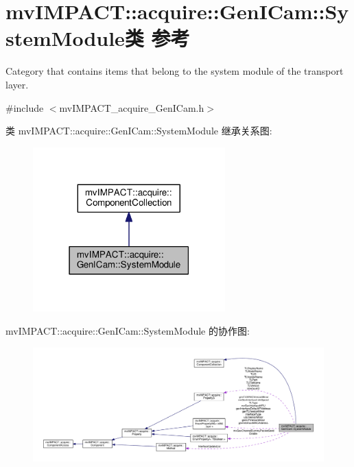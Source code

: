 \hypertarget{classmv_i_m_p_a_c_t_1_1acquire_1_1_gen_i_cam_1_1_system_module}{\section{mv\+I\+M\+P\+A\+C\+T\+:\+:acquire\+:\+:Gen\+I\+Cam\+:\+:System\+Module类 参考}
\label{classmv_i_m_p_a_c_t_1_1acquire_1_1_gen_i_cam_1_1_system_module}
}


Category that contains items that belong to the system module of the transport layer.  




{\ttfamily \#include $<$mv\+I\+M\+P\+A\+C\+T\+\_\+acquire\+\_\+\+Gen\+I\+Cam.\+h$>$}



类 mv\+I\+M\+P\+A\+C\+T\+:\+:acquire\+:\+:Gen\+I\+Cam\+:\+:System\+Module 继承关系图\+:
\nopagebreak
\begin{figure}[H]
\begin{center}
\leavevmode
\includegraphics[width=210pt]{classmv_i_m_p_a_c_t_1_1acquire_1_1_gen_i_cam_1_1_system_module__inherit__graph}
\end{center}
\end{figure}


mv\+I\+M\+P\+A\+C\+T\+:\+:acquire\+:\+:Gen\+I\+Cam\+:\+:System\+Module 的协作图\+:
\nopagebreak
\begin{figure}[H]
\begin{center}
\leavevmode
\includegraphics[width=350pt]{classmv_i_m_p_a_c_t_1_1acquire_1_1_gen_i_cam_1_1_system_module__coll__graph}
\end{center}
\end{figure}
